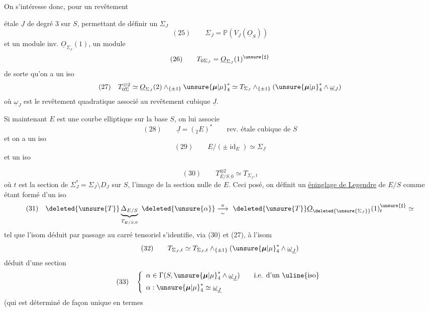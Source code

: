 On s'intéresse donc,  pour un revêtement


étale $\underline{J}$ de degré $3$ sur $S$, permettant de définir un $\Sigma_J$
\[
(25)\qquad \Sigma_J=\mathbb{P}(V_{\underline{J}}(\underline{O}_S))
\]
et un module inv. $\underline{O}_{\Sigma_J}(1)$, un module
\[
(26)\qquad T_{0\Sigma_J}=\underline{O}_{\Sigma_J}(1)^{\unsure{\sharp}}
\]
de sorte qu'on a un iso
\[
(27)\quad T_{0\Sigma}^{\otimes2}\simeq\underline{O}_{\Sigma_J}(2)\wedge_{\{\pm1\}}\unsure{\boldsymbol{\mu}|\mu}_4^*\simeq T_{\Sigma_J}\wedge_{\{\pm1\}}(\unsure{\boldsymbol{\mu}|\mu}_4^*\wedge\underline{\omega}_J)
\]
où $\underline{\omega}_J$ est le revêtement quadratique associé au revêtement cubique $\underline{J}$.

Si maintenant $E$ est une courbe elliptique sur la base $S$, on lui associe
\[
(28)\qquad \underline{J}=({}_2E)^*\qquad\text{rev. étale cubique de }S
\]
et on a un iso
\[
(29)\qquad E/(\pm\operatorname{id}_E)\simeq\Sigma_{\underline{J}}
\]
et un iso

\[
(30)\qquad T_{E/S,0}^{\otimes2}\simeq T_{\Sigma_{\underline{J}},t}
\]
où $t$ est la section de $\Sigma_J^*=\Sigma_J\setminus D_J$ sur $S$, l'image de la section nulle de $E$. Ceci posé, on définit un \uline{épinglage de Legendre} de $E/S$ comme étant formé d'un iso
\[
(31)\quad\deleted{\unsure{T}}\underbrace{\Delta_{E/S}}_{T_{E/S,0}}\ \deleted{\unsure{\alpha}}\overset{\kappa}{\underset{\sim}{\longrightarrow}}\ \deleted{\unsure{T}}\underline{O}_{\deleted{\unsure{\Sigma_J}}}(1)_{t}^{\unsure{\sharp}}\simeq
\]
tel que  l'isom déduit par passage au carré tensoriel s'identifie, via (30) et (27), à l'isom
\[
(32)\qquad T_{\Sigma_J,t}\simeq T_{\Sigma_J,t}\wedge_{\{\pm1\}}(\unsure{\boldsymbol{\mu}|\mu}_4^*\wedge\underline{\omega}_{\underline{J}})
\]
déduit d'une section
\[
(33)\quad\left\{\begin{array}{l}
\alpha\in\Gamma(S,\unsure{\boldsymbol{\mu}|\mu}_4^*\wedge\underline{\omega}_{\underline{J}})\qquad\text{i.e. d'un \uline{iso}}\\[5pt]
\alpha:\unsure{\boldsymbol{\mu}|\mu}_4^*\simeq\underline{\omega}_{\underline{J}}
\end{array}\right.
\]
(qui est déterminé de façon unique en termes

